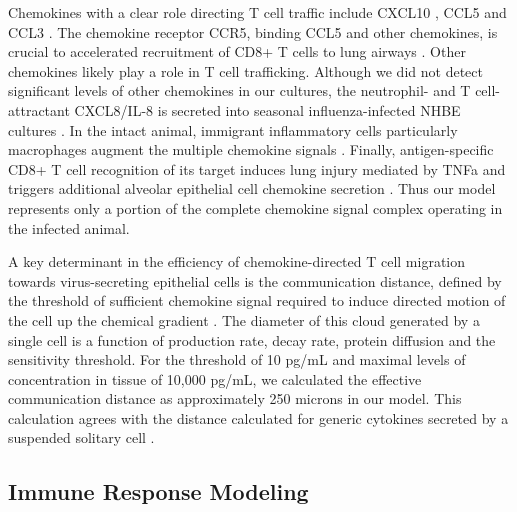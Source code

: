 \documentclass[10pt]{article}
\begin{document}
Chemokines with a clear role directing T cell traffic include CXCL10 \cite{Dufour2002}, CCL5 \cite{Kawai1999} and CCL3 \cite{Kawai1999}.  The chemokine receptor CCR5, binding CCL5 and other chemokines, is crucial to accelerated recruitment of CD8+ T cells to lung airways \cite{Kohlmeier2008}.  Other chemokines likely play a role in T cell trafficking.  Although we did not detect significant levels of other chemokines in our cultures, the neutrophil- and T cell-attractant CXCL8/IL-8 is secreted into seasonal influenza-infected NHBE cultures \cite{Matsukura1996, Arndt2002}.  In the intact animal, immigrant inflammatory cells particularly macrophages augment the multiple chemokine signals \cite{Julkunen2000}.  Finally, antigen-specific CD8+ T cell recognition of its target induces lung injury mediated by TNFa and triggers additional alveolar epithelial cell chemokine secretion \cite{Zhao2000}.   Thus our model represents only a portion of the complete chemokine signal complex operating in the infected animal.

A key determinant in the efficiency of chemokine-directed T cell migration towards virus-secreting epithelial cells is the communication distance, defined by the threshold of sufficient chemokine signal required to induce directed motion of the cell up the chemical gradient \cite{Thelen2008}.  The diameter of this cloud generated by a single cell is a function of production rate, decay rate, protein diffusion and the sensitivity threshold.  For the threshold of 10 pg/mL and maximal levels of concentration in tissue of 10,000 pg/mL, we calculated the effective communication distance as approximately 250 microns in our model.  This calculation agrees with the distance calculated for generic cytokines secreted by a suspended solitary cell \cite{Francis1997}.

\subsection*{Immune Response Modeling}
\end{document}
